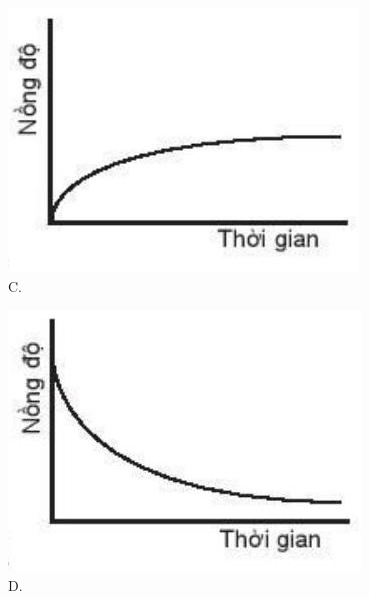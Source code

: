 \documentclass[10pt]{article}
\begin{document}
\begin{figure}[h]
\begin{center}
\captionsetup{labelformat=empty}
\caption{C.}
  \includegraphics[width=\textwidth]{2025_10_23_883c4b146e2332109fcdg-58(2)}
\end{center}
\end{figure}

\begin{figure}[h]
\begin{center}
\captionsetup{labelformat=empty}
\caption{D.}
  \includegraphics[width=\textwidth]{2025_10_23_883c4b146e2332109fcdg-58(1)}
\end{center}
\end{figure}
\end{document}

